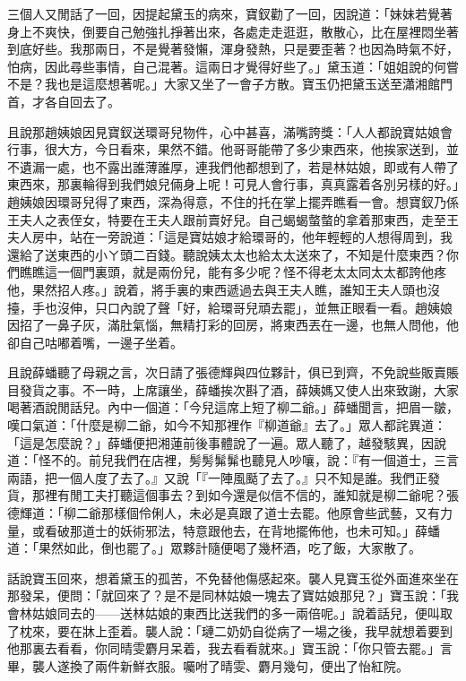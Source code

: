 三個人又閒話了一回，因提起黛玉的病來，寶釵勸了一回，因說道：「妹妹若覺著身上不爽快，倒要自己勉強扎掙著出來，各處走走逛逛，散散心，比在屋裡悶坐著到底好些。我那兩日，不是覺著發懶，渾身發熱，只是要歪著？也因為時氣不好，怕病，因此尋些事情，自己混著。這兩日才覺得好些了。」黛玉道：「姐姐說的何嘗不是？我也是這麼想著呢。」大家又坐了一會子方散。寶玉仍把黛玉送至瀟湘館門首，才各自回去了。

且說那趙姨娘因見寶釵送環哥兒物件，心中甚喜，滿嘴誇獎：「人人都說寶姑娘會行事，很大方，今日看來，果然不錯。他哥哥能帶了多少東西來，他挨家送到，並不遺漏一處，也不露出誰薄誰厚，連我們他都想到了，若是林姑娘，即或有人帶了東西來，那裏輪得到我們娘兒倆身上呢！可見人會行事，真真露着各別另樣的好。」趙姨娘因環哥兒得了東西，深為得意，不住的托在掌上擺弄瞧看一會。想寶釵乃係王夫人之表侄女，特要在王夫人跟前賣好兒。自己蝎蝎螫螫的拿着那東西，走至王夫人房中，站在一旁說道：「這是寶姑娘才給環哥的，他年輕輕的人想得周到，我還給了送東西的小ㄚ頭二百錢。聽說姨太太也給太太送來了，不知是什麼東西？你們瞧瞧這一個門裏頭，就是兩份兒，能有多少呢？怪不得老太太同太太都誇他疼他，果然招人疼。」說着，將手裏的東西遞過去與王夫人瞧，誰知王夫人頭也沒擡，手也沒伸，只口內說了聲「好，給環哥兒頑去罷」，並無正眼看一看。趙姨娘因招了一鼻子灰，滿肚氣惱，無精打彩的回房，將東西丟在一邊，也無人問他，他卻自己咕嘟着嘴，一邊子坐着。

且說薛蟠聽了母親之言，次日請了張德輝與四位夥計，俱已到齊，不免說些販賣賬目發貨之事。不一時，上席讓坐，薛蟠挨次斟了酒，薛姨媽又使人出來致謝，大家喝著酒說閒話兒。內中一個道：「今兒這席上短了柳二爺。」薛蟠聞言，把眉一皺，嘆口氣道：「什麼是柳二爺，如今不知那裡作『柳道爺』去了。」眾人都詫異道：「這是怎麼說？」薛蟠便把湘蓮前後事體說了一遍。眾人聽了，越發駭異，因說道：「怪不的。前兒我們在店裡，髣髣髴髴也聽見人吵嚷，說：『有一個道士，三言兩語，把一個人度了去了。』又說「『一陣風颳了去了。』只不知是誰。我們正發貨，那裡有閒工夫打聽這個事去？到如今還是似信不信的，誰知就是柳二爺呢？張德輝道：「柳二爺那樣個伶俐人，未必是真跟了道士去罷。他原會些武藝，又有力量，或看破那道士的妖術邪法，特意跟他去，在背地擺佈他，也未可知。」薛蟠道：「果然如此，倒也罷了。」眾夥計隨便喝了幾杯酒，吃了飯，大家散了。

話說寶玉回來，想着黛玉的孤苦，不免替他傷感起來。襲人見寶玉從外面進來坐在那發呆，便問：「就回來了？是不是同林姑娘一塊去了寶姑娘那兒？」寶玉說：「我會林姑娘同去的——送林姑娘的東西比送我們的多一兩倍呢。」說着話兒，便叫取了枕來，要在牀上歪着。襲人說：「璉二奶奶自從病了一場之後，我早就想着要到他那裏去看看，你同晴雯麝月呆着，我去看看就來。」寶玉說：「你只管去罷。」言畢，襲人遂換了兩件新鮮衣服。囑咐了晴雯、麝月幾句，便出了怡紅院。

